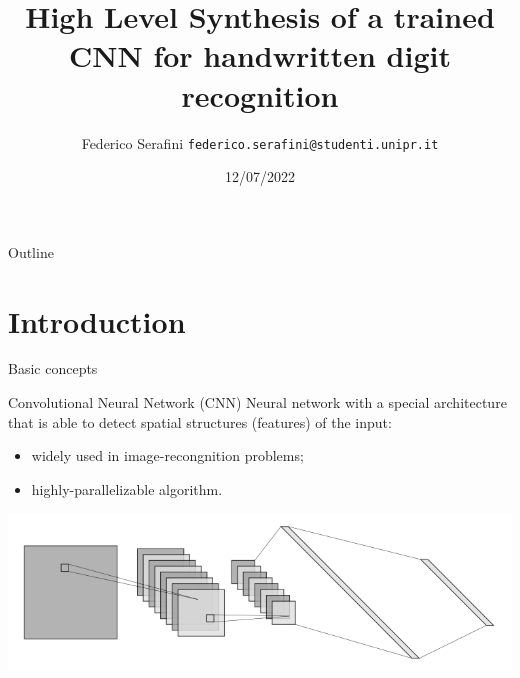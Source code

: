 \documentclass[xcolor=table]{beamer}
\title
{High Level Synthesis of a trained CNN for handwritten digit recognition}
\institute
{
  \large{Embedded Systems}
  \newline
  \small{Università degli Studi di Parma}
}
\author{
  Federico Serafini
  \newline
  \small\texttt{federico.serafini@studenti.unipr.it}
}
\date{12/07/2022}
\begin{document}
\begin{frame}[plain] %
  \titlepage
\end{frame}

\begin{frame}{Outline}
  \tableofcontents
\end{frame}

\section{Introduction}

\begin{frame}{Basic concepts}
  \begin{block}{Convolutional Neural Network (CNN)}
    Neural network with a special architecture that is able to detect spatial structures (features) of the input:
    \begin{itemize}
      \item widely used in image-recongnition problems;
      \item highly-parallelizable algorithm.
    \end{itemize}
  \end{block}

  \centering
  \includegraphics[scale=0.42]{Images/cnn.png}
\end{frame}
\end{document}
